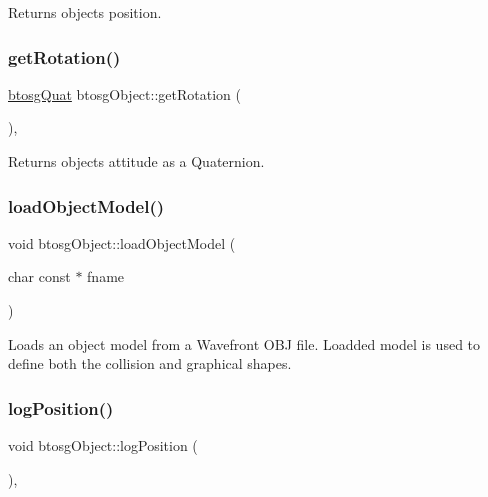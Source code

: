 Returns object\textquotesingle{}s position. \mbox{\label{classbtosgObject_a3b825999ad3a51bde743d4085ff19dae}} 
\subsubsection{\texorpdfstring{get\+Rotation()}{getRotation()}}
{\footnotesize\ttfamily \hyperlink{classbtosgQuat}{btosg\+Quat} btosg\+Object\+::get\+Rotation (\begin{DoxyParamCaption}{ }\end{DoxyParamCaption})\hspace{0.3cm}{\ttfamily [inline]}, {\ttfamily [inherited]}}

Returns object\textquotesingle{}s attitude as a Quaternion. \mbox{\label{classbtosgObject_a91838b8235579da178fcc06e6d3d47f3}} 
\subsubsection{\texorpdfstring{load\+Object\+Model()}{loadObjectModel()}}
{\footnotesize\ttfamily void btosg\+Object\+::load\+Object\+Model (\begin{DoxyParamCaption}\item[{char const $\ast$}]{fname }\end{DoxyParamCaption})\hspace{0.3cm}{\ttfamily [inherited]}}

Loads an object model from a Wavefront O\+BJ file. Loadded model is used to define both the collision and graphical shapes. \mbox{\label{classbtosgObject_acfd70fa6477c80fd7f29ad7ab9f4f067}} 
\subsubsection{\texorpdfstring{log\+Position()}{logPosition()}}
{\footnotesize\ttfamily void btosg\+Object\+::log\+Position (\begin{DoxyParamCaption}{ }\end{DoxyParamCaption})\hspace{0.3cm}{\ttfamily [inline]}, {\ttfamily [inherited]}}

